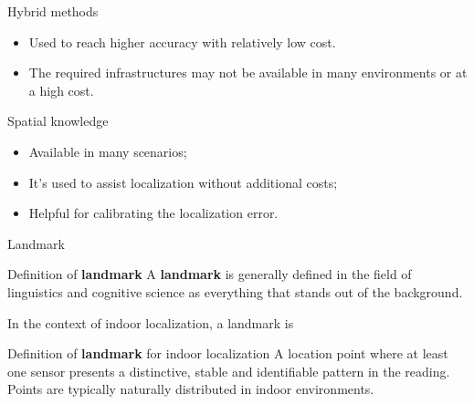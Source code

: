 \begin{frame}{Hybrid methods}

    \begin{itemize}
        \item Used to reach higher accuracy with relatively low cost.
    \end{itemize}

    \vspace{10pt}

    \begin{itemize}
        \item The required infrastructures may not be available in many environments or at a high cost.
    \end{itemize}
\end{frame}

\begin{frame}{Spatial knowledge}
    \begin{itemize}
        \item Available in many scenarios;
        \item It's used to assist localization without additional costs;
        \item Helpful for calibrating the localization error.
    \end{itemize}
\end{frame}

\begin{frame}{Landmark}
    \begin{block}{Definition of \textbf{landmark}}
        A \textbf{landmark} is generally defined in the field of linguistics and cognitive science as everything that stands out of the background.
    \end{block}

    In the context of indoor localization, a landmark is 
    \begin{block}{Definition of \textbf{landmark} for indoor localization}
        A location point where at least one sensor presents a distinctive, stable  and identifiable pattern in the reading. Points are typically naturally distributed in indoor environments.
    \end{block}
\end{frame}


